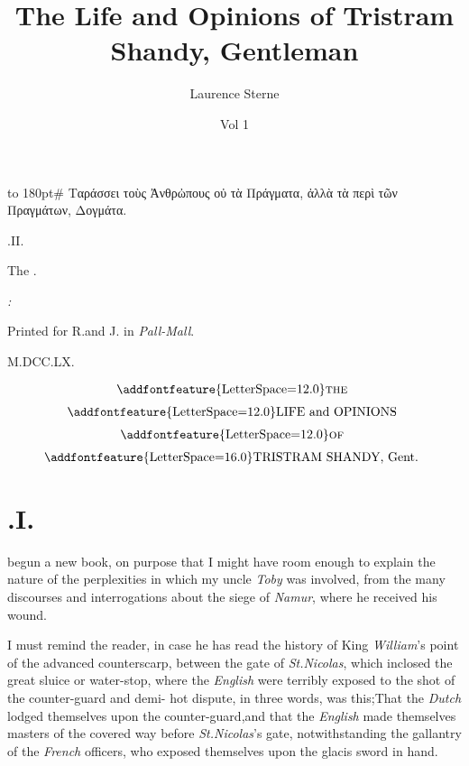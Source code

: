 \documentclass{article}
\title{The Life and Opinions of Tristram Shandy, Gentleman}
\author{Laurence Sterne}
\date{Vol 1}
\begin{document}
\pagestyle{empty}
\vbox{\openup 10pt}
\vfill
\vbox{\openup 2pt\halign to 180pt{\footnotesize #\cr
\quad Ταράσσει τοὺς Ἀνθρὠπους οὐ τὰ Πράγματα,\cr
ἀλλὰ τὰ περὶ τῶν Πραγμάτων, Δογμάτα.\hfill\cr}}
\bigskip
\centerline{.\quad II.}
\vfill
\centerline{The .}
\vfill
\centerline{\itshape{}:}
\centerline{\smaller Printed for R.\@ and J.\@ {} in \textit{Pall-Mall}.}
\centerline{M.DCC.LX.}
\newpage
\null
\newpage
\pagestyle{fancy}
\thispagestyle{empty}
\setcounter{page}{1}
\[\vbox{\openup 6pt\halign{\hss # \hss\cr
\addfontfeature{LetterSpace=12.0}\textsc{the}\cr
\addfontfeature{LetterSpace=12.0}LIFE and OPINIONS\cr
\addfontfeature{LetterSpace=12.0}\textsc{of}\cr
{\addfontfeature{LetterSpace=16.0}TRISTRAM SHANDY}, Gent.\cr}}\]

\vskip 6pt
\setlength{\baselineskip}{14pt}  %

\section{.\enspace  I.}

 begun a new book, on purpose that I might
have room enough to explain the nature of the perplexities in
which my uncle \textit{Toby} was involved, from the many
discourses and interrogations about the siege of \textit{Namur},
where he received his wound.

I must remind the reader, in case he has read the history of
King \textit{William}’s 
point of the advanced counterscarp,
be\-tween the gate of \textit{St.\@ Nicolas}, which inclo\-sed the
great sluice or water-stop, where the \textit{English} were
terribly exposed to the shot of the counter-guard and
demi-\break
{}
hot dispute, in three words, was this;\break That the \textit{Dutch}
lodged themselves upon the counter-guard,\tsk and that the
\textit{English} made themselves masters of the covered way
before \textit{St.\@ Nicolas}'s gate, notwithstanding the gallantry
of the \textit{French} offi\-cers, who exposed themselves upon the\break
glacis sword in hand.
\end{document}
